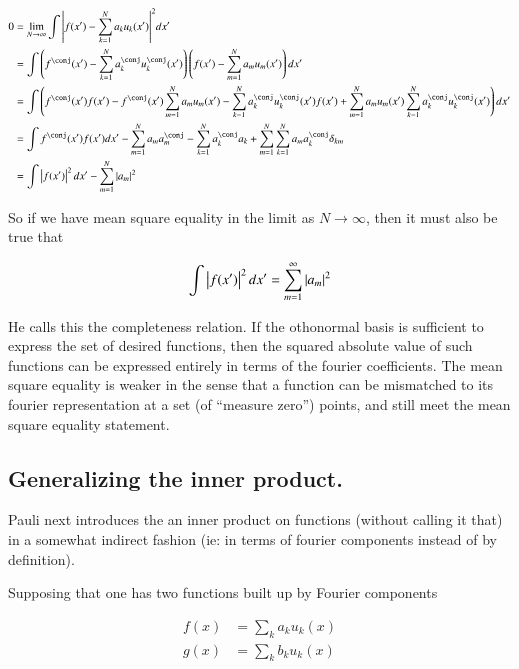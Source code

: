 \documentclass{article}
\begin{document}
\begin{align*}
0 &= \lim_{N \rightarrow \infty}\int 
{\Abs{f(x') -\sum_{k=1}^N a_k u_k(x') }}^2 dx'  \\
&=
\int \left(f^\conj(x') -\sum_{k=1}^N a_k^\conj u_k^\conj(x') \right) \left(f(x') - \sum_{m=1}^N a_m u_m(x') \right) 
dx' \\
&=
\int 
\left( f^\conj(x') f(x') 
-f^\conj(x') \sum_{m=1}^N a_m u_m(x') 
- \sum_{k=1}^N a_k^\conj u_k^\conj(x') f(x') 
+ \sum_{m=1}^N a_m u_m(x') \sum_{k=1}^N a_k^\conj u_k^\conj(x')  \right)
dx' \\
&=
\int f^\conj(x') f(x') dx'
- \sum_{m=1}^N a_m a_m^\conj
- \sum_{k=1}^N a_k^\conj a_k
+ \sum_{m=1}^N \sum_{k=1}^N a_m a_k^\conj \delta_{km} \\
&= \int \Abs{f(x')}^2 dx' - \sum_{m=1}^N \Abs{a_m}^2 \\
\end{align*}

So if we have mean square equality in the limit as $N \rightarrow \infty$, then it must also be true that

\begin{align*}
\int \left\lvert{f(x')}\right\rvert^2 dx' = \sum_{m=1}^\infty \left\lvert{a_m}\right\rvert^2 \\
\end{align*}

He calls this the completeness relation.  If the othonormal basis is sufficient to express the set of desired functions, then
the squared absolute value of such functions can be expressed entirely in terms of the fourier coefficients.  The mean square
equality is weaker in the sense that a function can be mismatched to its fourier representation at a set (of ``measure zero'') points,
and still meet the mean square equality statement.

\subsection{ Generalizing the inner product. }

Pauli next introduces the an inner product on functions (without calling it that) 
in a somewhat indirect
fashion (ie: in terms of fourier components instead of by definition).

Supposing that one has two functions built up by Fourier components

\begin{align*}
f(x) &= \sum_k a_k u_k(x) \\
g(x) &= \sum_k b_k u_k(x) \\
\end{align*}
\end{document}
